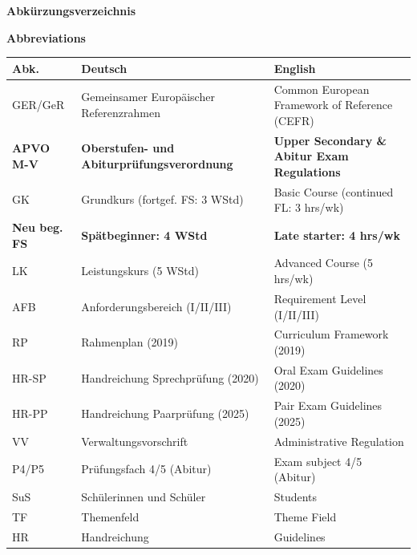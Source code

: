 \documentclass[10pt,a4paper]{article}
\newcommand{\secbil}[2]{%
\vspace{6pt}
\noindent\colorbox{spaet}{\parbox{0.48\textwidth}{\color{white}\bfseries\small #1}}%
\hfill%
\colorbox{english}{\parbox{0.48\textwidth}{\color{white}\bfseries\small #2}}
\vspace{3pt}
}
\begin{document}
\vspace{3mm}

\begin{center}
\end{center}

\vspace{6mm}

\vspace{4mm}
\secbil{Abkürzungsverzeichnis}{Abbreviations}

\vspace{2mm}

\begin{center}
\scriptsize
\begin{tabular}{|l|p{5cm}|p{5cm}|}
\hline
\rowcolor{lightgray}
\textbf{Abk.} & \textbf{Deutsch} & \textbf{English} \\
\hline
GER/GeR & Gemeinsamer Europäischer Referenzrahmen & Common European Framework of Reference (CEFR) \\
\hline
\textbf{APVO M-V} & \textbf{Oberstufen- und Abiturprüfungsverordnung} & \textbf{Upper Secondary \& Abitur Exam Regulations} \\
\hline
GK & Grundkurs (fortgef. FS: 3 WStd) & Basic Course (continued FL: 3 hrs/wk) \\
\hline
\textcolor{spaet}{\textbf{Neu beg. FS}} & \textcolor{spaet}{\textbf{Spätbeginner: 4 WStd}} & \textcolor{spaet}{\textbf{Late starter: 4 hrs/wk}} \\
\hline
LK & Leistungskurs (5 WStd) & Advanced Course (5 hrs/wk) \\
\hline
AFB & Anforderungsbereich (I/II/III) & Requirement Level (I/II/III) \\
\hline
RP & Rahmenplan (2019) & Curriculum Framework (2019) \\
\hline
HR-SP & Handreichung Sprechprüfung (2020) & Oral Exam Guidelines (2020) \\
\hline
HR-PP & Handreichung Paarprüfung (2025) & Pair Exam Guidelines (2025) \\
\hline
VV & Verwaltungsvorschrift & Administrative Regulation \\
\hline
P4/P5 & Prüfungsfach 4/5 (Abitur) & Exam subject 4/5 (Abitur) \\
\hline
SuS & Schülerinnen und Schüler & Students \\
\hline
TF & Themenfeld & Theme Field \\
\hline
HR & Handreichung & Guidelines \\
\hline
\end{tabular}
\end{center}
\end{document}
